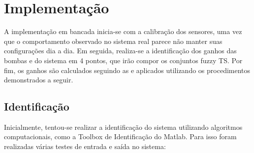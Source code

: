 %

\chapter{Implementação} \label{capImp}
A implementação em bancada inicia-se com a calibração dos sensores, uma vez que o comportamento observado no sistema real parece não manter suas configurações dia a dia. Em seguida, realiza-se a identificação dos ganhos das bombas e do sistema em 4 pontos, que irão compor os conjuntos fuzzy TS. Por fim, os ganhos são calculados seguindo as  e aplicados utilizando os procedimentos demonstrados a seguir.

\section{Identificação}
Inicialmente, tentou-se realizar a identificação do sistema utilizando algoritmos computacionais, como a Toolbox de Identificação do Matlab. Para isso foram realizadas várias testes de entrada e saída no sistema:
